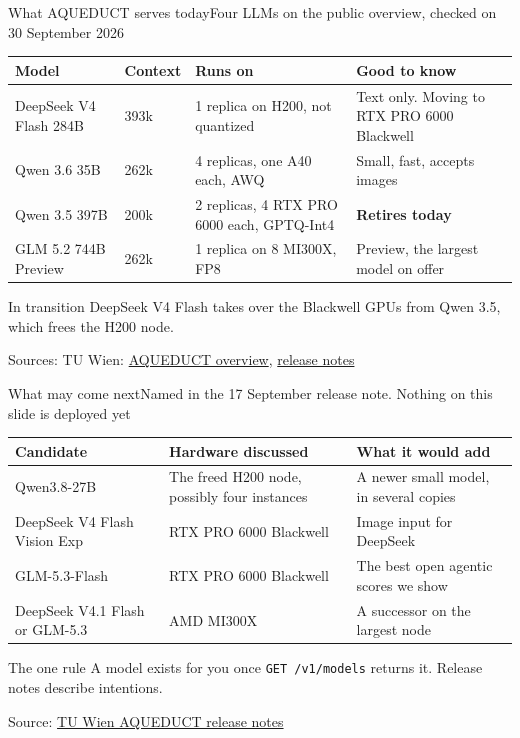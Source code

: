 \documentclass[aspectratio=169]{beamer}
\newcommand{\src}[2]{\par\vfill{\fontsize{7}{8}\selectfont\color{ACINgray}Source: \href{#1}{#2}}}
\newcommand{\srcmulti}[1]{\par\vfill{\fontsize{7}{8}\selectfont\color{ACINgray}Sources: #1}}
\begin{document}
\begin{frame}{What AQUEDUCT serves today}{Four LLMs on the public overview, checked on 30 September 2026}
\footnotesize
\renewcommand{\arraystretch}{1.15}
\begin{tabular}{@{}P{3.6cm}P{1.4cm}P{3.9cm}P{3.5cm}@{}}
\toprule
\textbf{Model} & \textbf{Context} & \textbf{Runs on} & \textbf{Good to know} \\
\midrule
DeepSeek V4 Flash 284B & 393k & 1 replica on H200, not quantized & Text only. Moving to RTX PRO 6000 Blackwell \\
Qwen 3.6 35B & 262k & 4 replicas, one A40 each, AWQ & Small, fast, accepts images \\
Qwen 3.5 397B & 200k & 2 replicas, 4 RTX PRO 6000 each, GPTQ-Int4 & \textcolor{ACINred}{\textbf{Retires today}} \\
GLM 5.2 744B Preview & 262k & 1 replica on 8 MI300X, FP8 & Preview, the largest model on offer \\
\bottomrule
\end{tabular}

\vspace{2mm}
\begin{block}{In transition}
DeepSeek V4 Flash takes over the Blackwell GPUs from Qwen 3.5, which frees the H200 node.
\end{block}
\srcmulti{TU Wien: \href{https://datalab.tuwien.ac.at/aiml/aqueduct/}{AQUEDUCT overview}, \href{https://datalab.tuwien.ac.at/aiml/aqueduct/release-notes/}{release notes}}
\end{frame}

\begin{frame}{What may come next}{Named in the 17 September release note. Nothing on this slide is deployed yet}
\footnotesize
\renewcommand{\arraystretch}{1.15}
\begin{tabular}{@{}P{4.4cm}P{3.9cm}P{4.1cm}@{}}
\toprule
\textbf{Candidate} & \textbf{Hardware discussed} & \textbf{What it would add} \\
\midrule
Qwen3.8-27B & The freed H200 node, possibly four instances & A newer small model, in several copies \\
DeepSeek V4 Flash Vision Exp & RTX PRO 6000 Blackwell & Image input for DeepSeek \\
GLM-5.3-Flash & RTX PRO 6000 Blackwell & The best open agentic scores we show \\
DeepSeek V4.1 Flash or GLM-5.3 & AMD MI300X & A successor on the largest node \\
\bottomrule
\end{tabular}

\vspace{2mm}
\begin{exampleblock}{The one rule}
A model exists for you once \texttt{GET /v1/models} returns it. Release notes describe intentions.
\end{exampleblock}
\src{https://datalab.tuwien.ac.at/aiml/aqueduct/release-notes/}{TU Wien AQUEDUCT release notes}
\end{frame}
\end{document}
